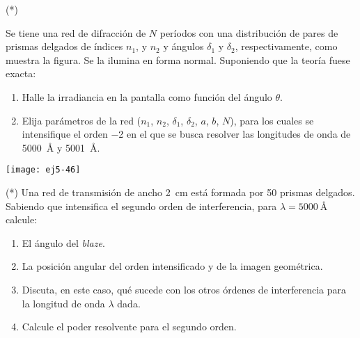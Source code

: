 \item (*)
\begin{minipage}[t][3.5cm]{0.88\textwidth}
Se tiene una red de difracción de $N$ períodos con una distribución de pares de prismas delgados de índices $n_1$, y $n_2$ y ángulos $\delta_1$ y $\delta_2$,
respectivamente, como muestra la figura.
Se la ilumina en forma normal.
Suponiendo que la teoría fuese exacta:
\begin{enumerate}
	\item Halle la irradiancia en la pantalla como función del ángulo $\theta$. 
	\item Elija parámetros de la red ($n_1$, $n_2$, $\delta_1$, $\delta_2$, $a$, $b$, $N$), para los cuales se intensifique el orden \num{-2} en el que se busca resolver las longitudes de onda de \SI{5000}{\angstrom} y \SI{5001}{\angstrom}.
\end{enumerate}
\end{minipage}
\begin{minipage}[c][0cm][t]{0.07\textwidth}
	\texttt{[image: ej5-46]}
\end{minipage}



\item (*) Una red de transmisión de ancho \SI{2}{\centi\metre} está formada por \num{50} prismas delgados.
Sabiendo que intensifica el segundo orden de interferencia, para $\lambda = \SI{5000}{\angstrom}$ calcule: 
\begin{enumerate}
	\item El ángulo del \emph{blaze}. 
	\item La posición angular del orden intensificado y de la imagen geométrica. 
	\item Discuta, en este caso, qué sucede con los otros órdenes de interferencia para la longitud de onda $\lambda$ dada.
	\item Calcule el poder resolvente para el segundo orden. 
\end{enumerate}
